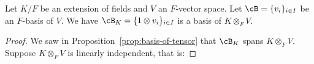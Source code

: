     \begin{proposition}
        Let $K/F$ be an extension of fields and $V$ an $F$-vector space. Let $\cB = \{v_i\}_{i \in I}$ be an $F$-basis of $V$. We have $\cB_K = \{1 \otimes v_i\}_{i \in I}$ is a basis of $K \otimes_F V$.
    \end{proposition}
        \begin{proof}
            We saw in Proposition~\ref{prop:basis-of-tensor} that $\cB_K$ spans $K \otimes_F V$. Suppose $K \otimes_F V$ is linearly independent, that is:
        \end{proof}